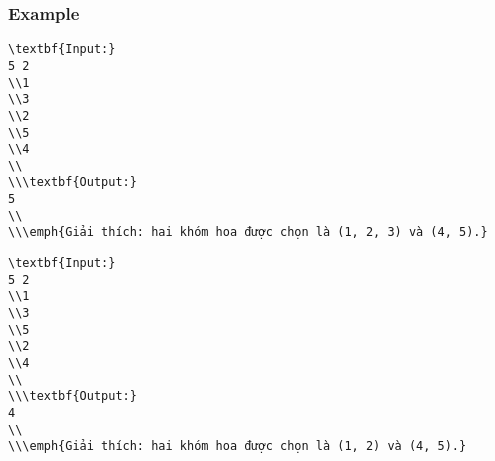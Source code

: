 \subsubsection{   Example  }
\begin{verbatim}
\textbf{Input:}
5 2
\\1 
\\3 
\\2 
\\5 
\\4
\\
\\\textbf{Output:}
5
\\
\\\emph{Giải thích: hai khóm hoa được chọn là (1, 2, 3) và (4, 5).}\end{verbatim}
\begin{verbatim}
\textbf{Input:}
5 2
\\1 
\\3 
\\5 
\\2 
\\4
\\
\\\textbf{Output:}
4
\\
\\\emph{Giải thích: hai khóm hoa được chọn là (1, 2) và (4, 5).}\end{verbatim}